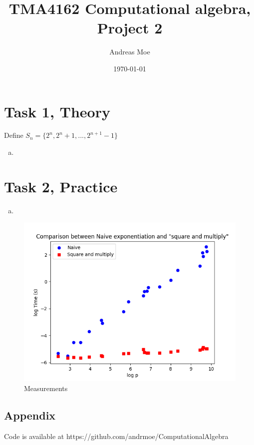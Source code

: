 \documentclass[12pt,a4paper]{article}
\title{TMA4162 Computational algebra, Project 2}
\author{Andreas Moe}
\date{\today}
\begin{document}
\maketitle

\section*{Task 1, Theory}
Define \(S_n = \{2^n, 2^n+1, ... , 2^{n+1}-1\}\)
\begin{enumerate}[a)]
    \item 
\end{enumerate}

\section*{Task 2, Practice}

\begin{enumerate}[a)]
    \item 
\end{enumerate}

\begin{figure}[htbp]
    \centering
    \includegraphics[width=\linewidth]{plot_2025-01-24 14-39-00_0.png}
    \caption{Measurements}
    \label{figure1}
\end{figure}
\newpage
\begin{appendix}
\section*{Appendix}
    Code is available at https://github.com/andrmoe/ComputationalAlgebra
    
    
\end{appendix}
\end{document}
